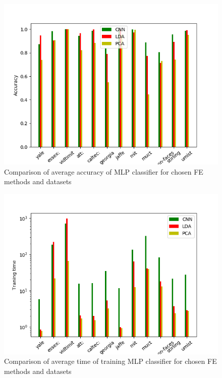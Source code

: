 \documentclass[a4paper, 10 pt, journal]{ieeeconf}
\begin{document}
\begin{figure}[!h]
    \centering
    \includegraphics[scale=0.875]{images/NN_accuracy_comparison.png}
    \caption{Comparison of average accuracy of MLP classifier for chosen FE methods and datasets}
    \label{fig:NN_acc_comparision}
\end{figure}

\begin{figure}[!h]
    \centering
    \includegraphics[scale=0.875]{images/NN_fit_time_comparison.png}
    \caption{Comparison of average time of training MLP classifier for chosen FE methods and datasets}
    \label{fig:svm_fit_time_comparision}
\end{figure}
\end{document}
